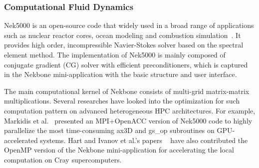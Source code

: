 \subsubsection{Computational Fluid Dynamics}

Nek5000 is an open-source code that widely used in a broad range of
applications such as nuclear reactor cores, ocean modeling and combustion
simulation~\cite{nek5000}. It provides high order, incompressible
Navier-Stokes solver based on the spectral element method. The implementation
of Nek5000 is mainly composed of conjugate gradient (CG) solver with
efficient preconditioners, which is captured in the Nekbone mini-application
with the basic structure and user interface.

The main computational kernel of Nekbone consists of multi-grid matrix-matrix
multiplications. Several researches have looked into the optimization for
such computation pattern on advanced heterogeneous HPC architectures. For
example, Markidis et al.~\cite{nek-openacc} presented an MPI+OpenACC version
of Nek5000 code to highly parallelize the most time-consuming ax3D and
gs\_op subroutines on GPU-accelerated systems. Hart and Ivanov et al.'s papers
~\cite{nek-eva, nek-openmp4} have also contributed the OpenMP version of
the Nekbone mini-application for accelerating the local computation on
Cray supercomputers.

